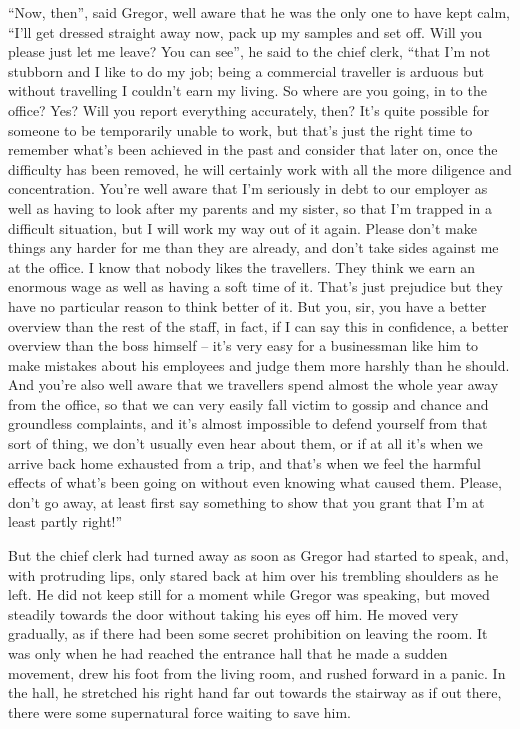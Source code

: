 “Now, then”, said Gregor, well aware that he was the only one to have
kept calm, “I’ll get dressed straight away now, pack up my samples and
set off. Will you please just let me leave? You can see”, he said to
the chief clerk, “that I’m not stubborn and I like to do my job; being
a commercial traveller is arduous but without travelling I couldn’t
earn my living. So where are you going, in to the office? Yes? Will you
report everything accurately, then? It’s quite possible for someone to
be temporarily unable to work, but that’s just the right time to
remember what’s been achieved in the past and consider that later on,
once the difficulty has been removed, he will certainly work with all
the more diligence and concentration. You’re well aware that I’m
seriously in debt to our employer as well as having to look after my
parents and my sister, so that I’m trapped in a difficult situation,
but I will work my way out of it again. Please don’t make things any
harder for me than they are already, and don’t take sides against me at
the office. I know that nobody likes the travellers. They think we earn
an enormous wage as well as having a soft time of it. That’s just
prejudice but they have no particular reason to think better of it. But
you, sir, you have a better overview than the rest of the staff, in
fact, if I can say this in confidence, a better overview than the boss
himself – it’s very easy for a businessman like him to make mistakes
about his employees and judge them more harshly than he should. And
you’re also well aware that we travellers spend almost the whole year
away from the office, so that we can very easily fall victim to gossip
and chance and groundless complaints, and it’s almost impossible to
defend yourself from that sort of thing, we don’t usually even hear
about them, or if at all it’s when we arrive back home exhausted from a
trip, and that’s when we feel the harmful effects of what’s been going
on without even knowing what caused them. Please, don’t go away, at
least first say something to show that you grant that I’m at least
partly right!”

But the chief clerk had turned away as soon as Gregor had started to
speak, and, with protruding lips, only stared back at him over his
trembling shoulders as he left. He did not keep still for a moment
while Gregor was speaking, but moved steadily towards the door without
taking his eyes off him. He moved very gradually, as if there had been
some secret prohibition on leaving the room. It was only when he had
reached the entrance hall that he made a sudden movement, drew his foot
from the living room, and rushed forward in a panic. In the hall, he
stretched his right hand far out towards the stairway as if out there,
there were some supernatural force waiting to save him.

